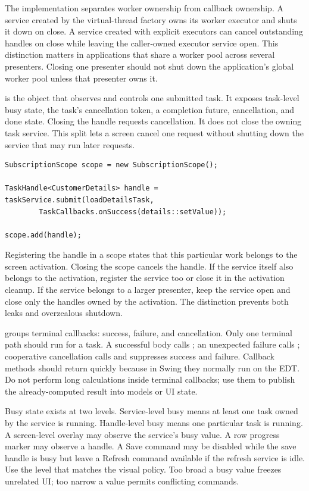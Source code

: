 The implementation separates worker ownership from callback ownership. A
service created by the virtual-thread factory owns its worker executor and
shuts it down on close. A service created with explicit executors can cancel
outstanding handles on close while leaving the caller-owned executor service
open. This distinction matters in applications that share a worker pool across
several presenters. Closing one presenter should not shut down the application's
global worker pool unless that presenter owns it.

 is the object that observes and controls one
submitted task. It exposes task-level busy state, the task's cancellation token,
a completion future, cancellation, and done state. Closing the handle requests
cancellation. It does not close the owning task service. This split lets a
screen cancel one request without shutting down the service that may run later
requests.

\begin{lstlisting}[caption={A screen owns the handles it starts.}]
SubscriptionScope scope = new SubscriptionScope();

TaskHandle<CustomerDetails> handle = taskService.submit(loadDetailsTask,
        TaskCallbacks.onSuccess(details::setValue));

scope.add(handle);
\end{lstlisting}

Registering the handle in a scope states that this particular work belongs to
the screen activation. Closing the scope cancels the handle. If the service
itself also belongs to the activation, register the service too or close it in
the activation cleanup. If the service belongs to a larger presenter, keep the
service open and close only the handles owned by the activation. The distinction
prevents both leaks and overzealous shutdown.

 groups terminal callbacks: success, failure, and
cancellation. Only one terminal path should run for a task. A successful body
calls ; an unexpected failure calls ; cooperative
cancellation calls  and suppresses success and failure. Callback
methods should return quickly because in Swing they normally run on the EDT.
Do not perform long calculations inside terminal callbacks; use them to publish
the already-computed result into models or UI state.

Busy state exists at two levels. Service-level busy means at least one task
owned by the service is running. Handle-level busy means one particular task is
running. A screen-level overlay may observe the service's busy value. A row
progress marker may observe a handle. A Save command may be disabled while the
save handle is busy but leave a Refresh command available if the refresh
service is idle. Use the level that matches the visual policy. Too broad a busy
value freezes unrelated UI; too narrow a value permits conflicting commands.

